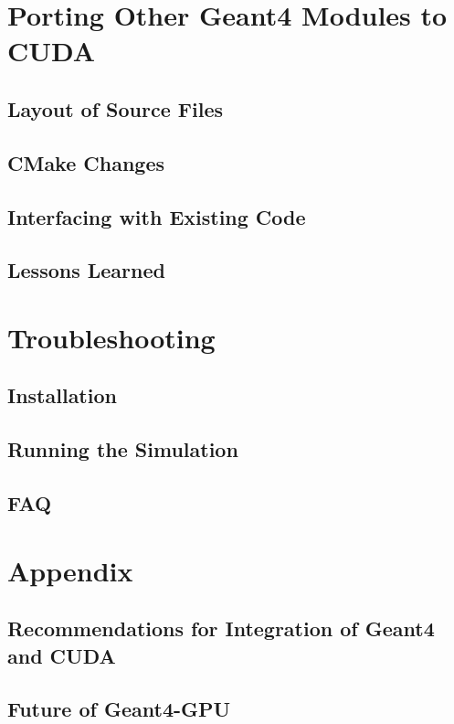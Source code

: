\documentclass[12pt]{article}
\begin{document}
\section{Porting Other Geant4 Modules to CUDA} %
\subsection{Layout of Source Files} %
\subsection{CMake Changes} %
\subsection{Interfacing with Existing Code} %
\subsection{Lessons Learned} %

\section{Troubleshooting} %
\subsection{Installation} %
\subsection{Running the Simulation} %
\subsection{FAQ} %

\section{Appendix} %
\subsection{Recommendations for Integration of Geant4 and CUDA}
\subsection{Future of Geant4-GPU}
\end{document}
